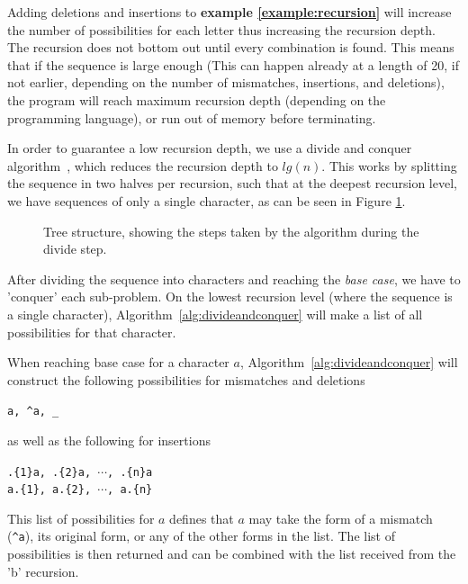 \documentclass[12pt]{article}
\theoremstyle{definition}
\begin{document}
Adding deletions and insertions to \textbf{example \ref{example:recursion}} will increase the number of possibilities for each letter thus increasing the recursion depth. The recursion does not bottom out until every combination is found. This means that if the sequence is large enough (This can happen already at a length of 20, if not earlier, depending on the number of mismatches, insertions, and deletions), the program will reach maximum recursion depth (depending on the programming language), or run out of memory before terminating.

In order to guarantee a low recursion depth, we use a divide and conquer algorithm~\cite{Algorithms}, which reduces the recursion depth to $lg(n)$. This works by splitting the sequence in two halves per recursion, such that at the deepest recursion level, we have sequences of only a single character, as can be seen in Figure \ref{fig:tree_example}. 

\begin{figure}[H]
	\centering
	\caption{Tree structure, showing the steps taken by the algorithm during the divide step.}
	\label{fig:tree_example}
\end{figure}

After dividing the sequence into characters and reaching the \emph{base case}, we have to 'conquer' each sub-problem. On the lowest recursion level (where the sequence is a single character), Algorithm~\ref{alg:divideandconquer} will make a list of all possibilities for that character.

\begin{definition}[label=definition:possibilities]
When reaching base case for a character $a$, Algorithm~\ref{alg:divideandconquer} will construct the following possibilities for mismatches and deletions

\begin{center}
	\texttt{a, \^{}a, \_}
\end{center}

\noindent as well as the following for insertions

\begin{center}
	\texttt{.\{1\}a, .\{2\}a, $\cdots$, .\{n\}a} \\
	\texttt{a.\{1\}, a.\{2\}, $\cdots$, a.\{n\}}
\end{center}

\noindent This list of possibilities for $a$ defines that $a$ may take the form of a mismatch (\texttt{\^{}a}), its original form, or any of the other forms in the list. The list of possibilities is then returned and can be combined with the list received from the 'b' recursion.
\end{definition}
\end{document}
